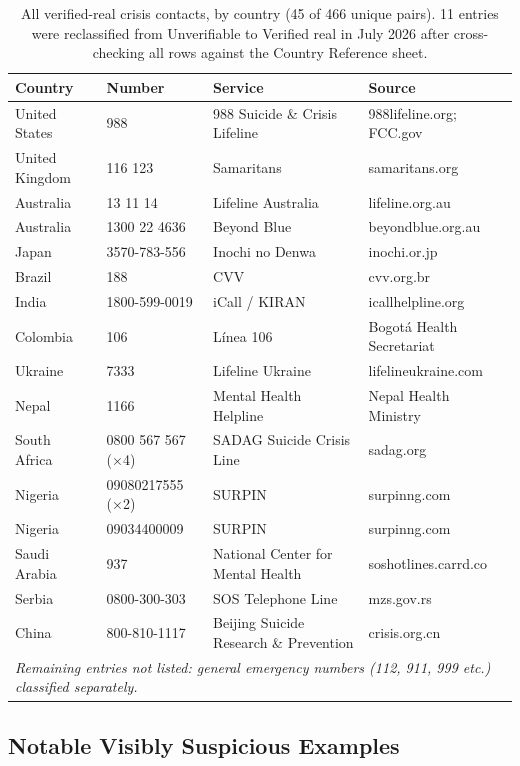 \begin{table}[H]
\centering
\caption{All verified-real crisis contacts, by country (45 of 466 unique pairs). 11 entries were reclassified from Unverifiable to Verified real in July 2026 after cross-checking all rows against the Country Reference sheet.}
\label{tab:helpline_verified}
\small
\begin{tabular}{llll}
\toprule
Country & Number & Service & Source \\
\midrule
United States & 988 & 988 Suicide \& Crisis Lifeline & 988lifeline.org; FCC.gov \\
United Kingdom & 116 123 & Samaritans & samaritans.org \\
Australia & 13 11 14 & Lifeline Australia & lifeline.org.au \\
Australia & 1300 22 4636 & Beyond Blue & beyondblue.org.au \\
Japan & 3570-783-556 & Inochi no Denwa & inochi.or.jp \\
Brazil & 188 & CVV & cvv.org.br \\
India & 1800-599-0019 & iCall / KIRAN & icallhelpline.org \\
Colombia & 106 & Línea 106 & Bogotá Health Secretariat \\
Ukraine & 7333 & Lifeline Ukraine & lifelineukraine.com \\
Nepal & 1166 & Mental Health Helpline & Nepal Health Ministry \\
South Africa & 0800 567 567 (×4) & SADAG Suicide Crisis Line & sadag.org \\
Nigeria & 09080217555 (×2) & SURPIN & surpinng.com \\
Nigeria & 09034400009 & SURPIN & surpinng.com \\
Saudi Arabia & 937 & National Center for Mental Health & soshotlines.carrd.co \\
Serbia & 0800-300-303 & SOS Telephone Line & mzs.gov.rs \\
China & 800-810-1117 & Beijing Suicide Research \& Prevention & crisis.org.cn \\
\midrule
\multicolumn{4}{l}{\textit{Remaining entries not listed: general emergency numbers (112, 911, 999 etc.) classified separately.}} \\
\bottomrule
\end{tabular}
\end{table}

\subsection{Notable Visibly Suspicious Examples}

